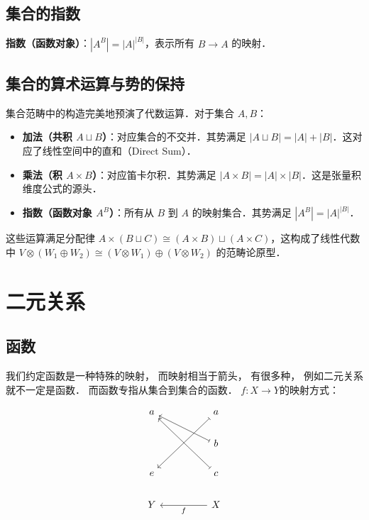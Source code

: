 \documentclass[10pt, openany]{book}
\begin{document}
\section{集合的指数}

\textbf{指数（函数对象）}：$|A^B| = |A|^{|B|}$，表示所有 $B \to A$ 的映射．

\section{集合的算术运算与势的保持}
集合范畴中的构造完美地预演了代数运算．对于集合 $A, B$：
\begin{itemize}
    \item \textbf{加法（共积 $A \sqcup B$）}：对应集合的不交并．其势满足 $|A \sqcup B| = |A| + |B|$．这对应了线性空间中的直和（Direct Sum）．
    \item \textbf{乘法（积 $A \times B$）}：对应笛卡尔积．其势满足 $|A \times B| = |A| \times |B|$．这是张量积维度公式的源头．
    \item \textbf{指数（函数对象 $A^B$）}：所有从 $B$ 到 $A$ 的映射集合．其势满足 $|A^B| = |A|^{|B|}$．
\end{itemize}
这些运算满足分配律 $A \times (B \sqcup C) \cong (A \times B) \sqcup (A \times C)$，这构成了线性代数中 $V \otimes (W_1 \oplus W_2) \cong (V \otimes W_1) \oplus (V \otimes W_2)$ 的范畴论原型．

\chapter{二元关系}


\section{函数}

我们约定函数是一种特殊的映射，
而映射相当于箭头，
有很多种，
例如二元关系就不一定是函数．
而函数专指从集合到集合的函数．
$f:X \to Y$的映射方式：

$$
\begin{tikzcd}
a &  & a \arrow[lldd, maps to] \\
  &  & b \arrow[llu, maps to]  \\
e &  & c \arrow[lluu, maps to] \\
Y &  & X \arrow[ll, "f"]      
\end{tikzcd}
$$
\end{document}
